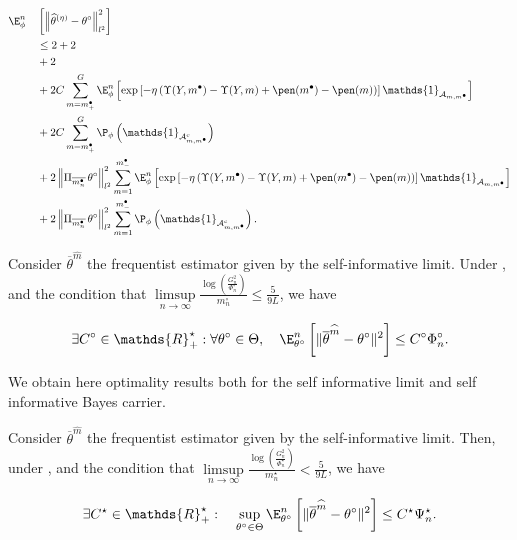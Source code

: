 \begin{alignat*}{2}
& \E_{\phi}^{n}&& \left[ \left\Vert \widehat{\theta}^{(\eta)} - \theta^{\circ} \right\Vert_{l^{2}}^{2}\right]\\
& && \leq 2  + 2 \\
& && + 2  \\
& && + 2 C \sum_{m = m^{\bullet}_{+}}^{G} \E_{\phi}^{n}\left[\exp\left[- \eta \left(\Upsilon(Y, m^{\bullet}) - \Upsilon(Y, m) + \pen(m^{\bullet}) - \pen(m) \right)\right] \mathds{1}_{\mathcal{A}_{m, m^{\bullet}}} \right]\\
& && + 2 C \sum_{m = m^{\bullet}_{+}}^{G} \P_{\phi}\left(\mathds{1}_{\mathcal{A}_{m, m^{\bullet}}^{c}}\right) \\
& && + 2 \left\Vert \Pi_{\overline{m^{\bullet}_{n}}} \, \theta^{\circ} \right\Vert_{l^{2}}^{2} \sum_{m = 1}^{m^{\bullet}_{-}} \E_{\phi}^{n}\left[\exp\left[- \eta \left(\Upsilon(Y, m^{\bullet}) - \Upsilon(Y, m) + \pen(m^{\bullet}) - \pen(m) \right)\right] \mathds{1}_{\mathcal{A}_{m, m^{\bullet}}} \right]\\
& &&+ 2 \left\Vert \Pi_{\overline{m^{\bullet}_{n}}} \, \theta^{\circ} \right\Vert_{l^{2}}^{2} \sum_{m = 1}^{m^{\bullet}_{-}} \P_{\phi}\left(\mathds{1}_{\mathcal{A}_{m, m^{\bullet}}^{c}}\right).
\end{alignat*}

\begin{thm}\label{THM_FREQ_IGSSM_KNOWN_IID_ORACLE_NP}
Consider $\overline{\theta}^{\widehat{m}}$ the frequentist estimator given by the self-informative limit.
Under ,  and the condition that $\limsup\limits_{n \rightarrow \infty}\frac{\log\left(\frac{G_{n}^{2}}{\Phi_{n}^{\circ}}\right)}{m_{n}^{\circ}} \leq \frac{5}{9 L}$, we have

\[\exists C^{\circ} \in \mathds{R}_{+}^{\star} : \forall \theta^{\circ} \in \Theta, \quad \E_{\theta^{\circ}}^{n}\left[\Vert \overline{\theta}^{\widehat{m}} - \theta^{\circ} \Vert^{2}\right] \leq C^{\circ} \Phi_{n}^{\circ}.\]
\end{thm}

We obtain here optimality results both for the self informative limit and self informative Bayes carrier.

\begin{thm}\label{THM_FREQ_IGSSM_KNOWN_IID_MINIMAX_NP}
Consider $\overline{\theta}^{\widehat{m}}$ the frequentist estimator given by the self-informative limit.
Then, under ,  and the condition that $\limsup\limits_{n \rightarrow \infty}\frac{\log\left(\frac{G_{n}^{2}}{\Phi_{n}^{\star}}\right)}{m_{n}^{\star}} < \frac{5}{9 L}$, we have

\[\exists C^{\star} \in \mathds{R}_{+}^{\star} : \quad \sup\limits_{\theta^{\circ}\in \Theta}\E_{\theta^{\circ}}^{n}\left[\Vert \overline{\theta}^{\widehat{m}} - \theta^{\circ} \Vert^{2}\right] \leq C^{\star} \Psi_{n}^{\star}.\]
\end{thm}


